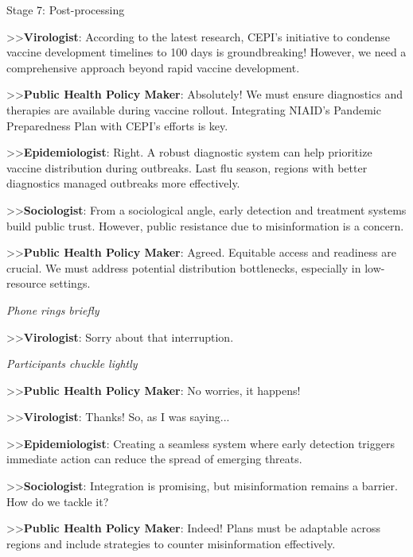\begin{figure*}[t]
    \begin{AIbox}{Stage 7: Post-processing}
    \parbox[t]{\textwidth}{
    >>\textbf{Virologist}: According to the latest research, CEPI's initiative to condense vaccine development timelines to 100 days is groundbreaking! However, we need a comprehensive approach beyond rapid vaccine development.

    >>\textbf{Public Health Policy Maker}: Absolutely! We must ensure diagnostics and therapies are available during vaccine rollout. Integrating NIAID's Pandemic Preparedness Plan with CEPI's efforts is key.

    >>\textbf{Epidemiologist}: Right. A robust diagnostic system can help prioritize vaccine distribution during outbreaks. Last flu season, regions with better diagnostics managed outbreaks more effectively.

    >>\textbf{Sociologist}: From a sociological angle, early detection and treatment systems build public trust. However, public resistance due to misinformation is a concern.

    >>\textbf{Public Health Policy Maker}: Agreed. Equitable access and readiness are crucial. We must address potential distribution bottlenecks, especially in low-resource settings.

    \textit{Phone rings briefly}

    >>\textbf{Virologist}: Sorry about that interruption.

    \textit{Participants chuckle lightly}

    >>\textbf{Public Health Policy Maker}: No worries, it happens!

    >>\textbf{Virologist}: Thanks! So, as I was saying...

    >>\textbf{Epidemiologist}: Creating a seamless system where early detection triggers immediate action can reduce the spread of emerging threats.

    >>\textbf{Sociologist}: Integration is promising, but misinformation remains a barrier. How do we tackle it?

    >>\textbf{Public Health Policy Maker}: Indeed! Plans must be adaptable across regions and include strategies to counter misinformation effectively.
    }
    \end{AIbox}
    \caption{Stage 7: Post-processing — Full dialogue with context and interactions.}
    \label{fig:stage7_post_processing}
\end{figure*}
